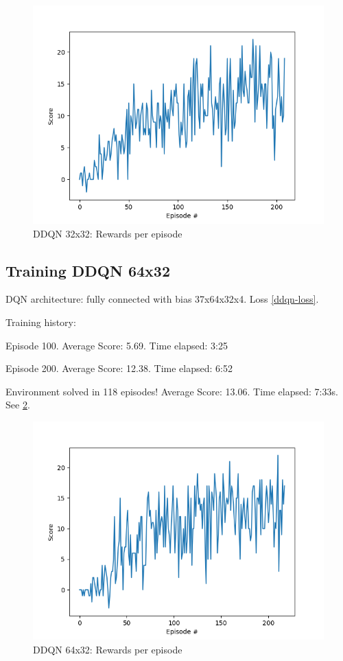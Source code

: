 \documentclass{report}
\begin{document}
\begin{figure}
\includegraphics[width=0.9\linewidth]{res/DDQN_32x32/score.png}
\caption{DDQN 32x32: Rewards per episode}
\label{fig:DDQN_32x32}
\end{figure}


\subsection*{Training DDQN 64x32}

DQN architecture: fully connected with bias 37x64x32x4. Loss \ref{ddqn-loss}.

Training history:

Episode 100.	Average Score: 5.69.	Time elapsed: 3:25

Episode 200.	Average Score: 12.38.	Time elapsed: 6:52

Environment solved in 118 episodes!	Average Score: 13.06. Time elapsed: 7:33s. See \ref{fig:DDQN_64x32}.

\begin{figure}
\includegraphics[width=0.9\linewidth]{res/DDQN_64x32/score.png}
\caption{DDQN 64x32: Rewards per episode}
\label{fig:DDQN_64x32}
\end{figure}
\end{document}

